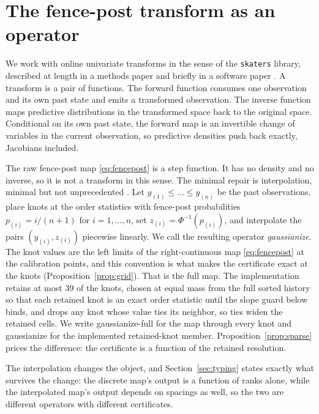 \documentclass[11pt]{article}
\theoremstyle{remark}
\begin{document}
\section{The fence-post transform as an operator}\label{sec:operator}

We work with online univariate transforms in the sense of the \texttt{skaters} library,
described at length in a methods paper \citep{cotton_skaters} and briefly in a software
paper \citep{cotton_skaters_joss}. A transform is a pair of functions. The forward function consumes
one observation and its own past state and emits a transformed observation. The inverse
function maps predictive distributions in the transformed space back to the original space.
Conditional on its own past state, the forward map is an invertible change of variables in
the current observation, so predictive densities push back exactly, Jacobians included.

The raw fence-post map \eqref{eq:fencepost} is a step function. It has no density and no
inverse, so it is not a transform in this sense. The minimal repair is interpolation,
minimal but not unprecedented \citep{harar2022redistributor}. Let
$y_{(1)} \le \dots \le y_{(n)}$ be the past observations, place knots at the order
statistics with fence-post probabilities $p_{(i)} = i/(n+1)$ for
$i = 1, \dots, n$, set
$z_{(i)} = \Phi^{-1}(p_{(i)})$, and interpolate the pairs $(y_{(i)}, z_{(i)})$ piecewise
linearly. We call the resulting operator \emph{gaussianize}. The knot values are the
left limits of the right-continuous map \eqref{eq:fencepost} at the calibration points,
and this convention is what makes the certificate exact at the knots
(Proposition~\ref{prop:grid}). That is the full map. The implementation retains at
most $39$ of the knots, chosen at equal mass from the full sorted history so that
each retained knot is an exact order statistic until the slope guard below binds, and
drops any knot whose value ties its neighbor, so ties widen the retained cells. We write gaussianize-full for the map
through every knot and gaussianize for the implemented retained-knot member.
Proposition~\ref{prop:sparse} prices the difference: the certificate is a function of
the retained resolution.

The interpolation changes
the object, and Section~\ref{sec:typing} states exactly what survives the change: the
discrete map's output is a function of ranks alone, while the interpolated map's output
depends on spacings as well, so the two are different operators with different
certificates.
\end{document}

